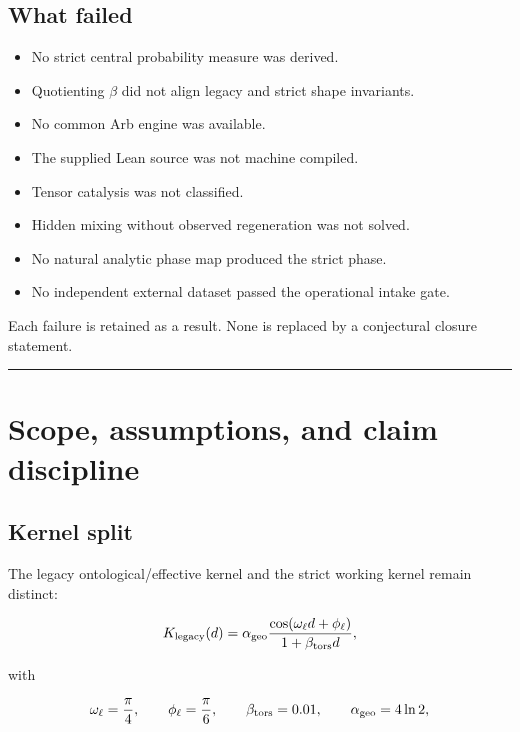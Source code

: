 \documentclass[11pt,a4paper,openany]{report}
\begin{document}
\section{What failed}

\begin{itemize}
\item 
No strict central probability measure was derived.

\item 
Quotienting \(\beta\) did not align legacy and strict shape invariants.

\item 
No common Arb engine was available.

\item 
The supplied Lean source was not machine compiled.

\item 
Tensor catalysis was not classified.

\item 
Hidden mixing without observed regeneration was not solved.

\item 
No natural analytic phase map produced the strict phase.

\item 
No independent external dataset passed the operational intake gate.

\end{itemize}

Each failure is retained as a result. None is replaced by a conjectural closure statement.

\par\medskip\hrule\medskip

\chapter{Scope, assumptions, and claim discipline}

\section{Kernel split}

The legacy ontological/\allowbreak{}effective kernel and the strict working kernel remain distinct:

\[
K_{\rm legacy}(d)=
\alpha_{\rm geo}
\frac{\cos(\omega_\ell d+\phi_\ell)}
{1+\beta_{\rm tors}d},
\]

with

\[
\omega_\ell=\frac{\pi}{4},
\qquad
\phi_\ell=\frac{\pi}{6},
\qquad
\beta_{\rm tors}=0.01,
\qquad
\alpha_{\rm geo}=4\ln2,
\]
\end{document}
